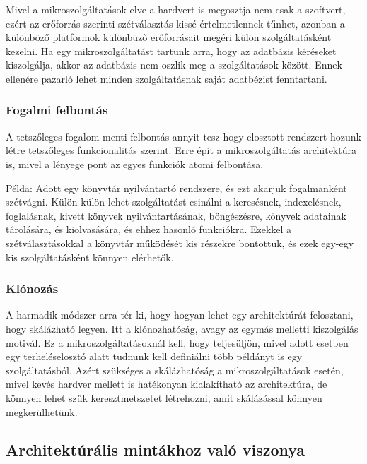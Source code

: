 \documentclass[11pt,magyar,a4paper,twoside,]{report}
\begin{document}
Mivel a mikroszolgáltatások elve a hardvert is megosztja nem csak a
szoftvert, ezért az erőforrás szerinti szétválasztás kissé
értelmetlennek tűnhet, azonban a különböző platformok különbüző
erőforrásait megéri külön szolgáltatásként kezelni. Ha egy
mikroszolgáltatást tartunk arra, hogy az adatbázis kéréseket
kiszolgálja, akkor az adatbázis nem oszlik meg a szolgáltatások között.
Ennek ellenére pazarló lehet minden szolgáltatásnak saját adatbézist
fenntartani.

\subsubsection{Fogalmi felbontás}\label{fogalmi-felbontuxe1s}

A tetszőleges fogalom menti felbontás annyit tesz hogy elosztott
rendszert hozunk létre tetszőleges funkcionalitás szerint. Erre épít a
mikroszolgáltatás architektúra is, mivel a lényege pont az egyes
funkciók atomi felbontása.

Példa: Adott egy könyvtár nyilvántartó rendszere, és ezt akarjuk
fogalmanként szétvágni. Külön-külön lehet szolgáltatást csinálni a
keresésnek, indexelésnek, foglalásnak, kivett könyvek nyilvántartásának,
böngészésre, könyvek adatainak tárolására, és kiolvasására, és ehhez
hasonló funkciókra. Ezekkel a szétválasztásokkal a könyvtár működését
kis részekre bontottuk, és ezek egy-egy kis szolgáltatásként könnyen
elérhetők.

\subsubsection{Klónozás}\label{kluxf3nozuxe1s}

A harmadik módszer arra tér ki, hogy hogyan lehet egy architektúrát
felosztani, hogy skálázható legyen. Itt a klónozhatóság, avagy az egymás
melletti kiszolgálás motivál. Ez a mikroszolgáltatásoknál kell, hogy
teljesüljön, mivel adott esetben egy terheléselosztó alatt tudnunk kell
definiálni több példányt is egy szolgáltatásból. Azért szükséges a
skálázhatóság a mikroszolgáltatások esetén, mivel kevés hardver mellett
is hatékonyan kialakítható az architektúra, de könnyen lehet szűk
keresztmetszetet létrehozni, amit skálázással könnyen megkerülhetünk.

\subsection{Architektúrális mintákhoz való
viszonya}\label{architektuxfaruxe1lis-mintuxe1khoz-valuxf3-viszonya}
\end{document}
